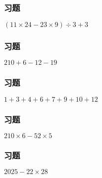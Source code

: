 \begin{frame}
    \frametitle{习题\theframecounter}
    \vspace*{-3cm}   \centering\textit{\Large $(11\times 24 - 23\times 9)\div 3 + 3$}
\end{frame}

\begin{frame}
    \frametitle{习题\theframecounter}
    \vspace*{-3cm}    \centering\textit{\Large $210 + 6-12 - 19$}
\end{frame}

\begin{frame}
    \frametitle{习题\theframecounter} 
    \vspace*{-3cm}   \centering\textit{\Large $1+3+4+6+7+9+10 + 12$}
\end{frame}

\begin{frame}
    \frametitle{习题\theframecounter}
    \vspace*{-3cm}    \centering\textit{\Large $210\times 6 - 52\times 5$}
\end{frame}

\begin{frame}
    \frametitle{习题\theframecounter}
    \vspace*{-3cm}    \centering\textit{\Large $2025- 22\times 28$}
\end{frame}